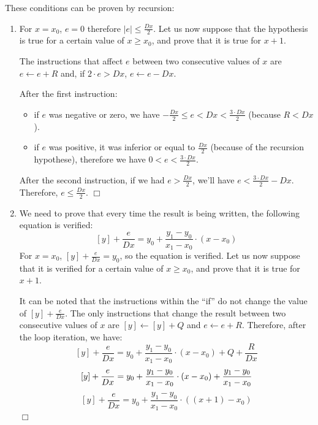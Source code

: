 \documentclass[a4paper,11pt]{kthesis}
\begin{document}
These conditions can be proven by recursion:
\begin{enumerate}
\item For $x = x_{0}$, $e = 0$ therefore $|e| \leq \frac{Dx}{2}$. Let us now suppose that the hypothesis is true for a certain value of $x \geq x_{0}$, and prove that it is true for $x+1$.

The instructions that affect $e$ between two consecutive values of $x$ are $e \leftarrow e + R$ and, if $2\cdot e > Dx$, $e \leftarrow e - Dx$.

After the first instruction:
\begin{itemize}
\item if $e$ was negative or zero, we have $-\frac{Dx}{2} \leq e < Dx < \frac{3 \cdot Dx}{2} $ (because $R < Dx$).
\item if $e$ was positive, it was inferior or equal to $\frac{Dx}{2}$ (because of the recursion hypothese), therefore we have $0 < e < \frac{3 \cdot Dx}{2} $.
\end{itemize}
After the second instruction, if we had $e > \frac{Dx}{2}$, we'll have $e < \frac{3 \cdot Dx}{2} - Dx$. Therefore, $e \leq \frac{Dx}{2}$. $\Box$

\item We need to prove that every time the result is being written, the following equation is verified:
\begin{equation}
\hspace{0cm} [y] + \frac{e}{Dx} = y_{0} + \frac{y_{1}-y_{0}}{x_{1}-x_{0}} \cdot (x - x_{0})
\end{equation}
For $x = x_{0}$, $[y] + \frac{e}{Dx} = y_{0}$, so the equation is verified. Let us now suppose that it is verified for a certain value of $x \geq x_{0}$, and prove that it is true for $x+1$.

It can be noted that the instructions within the ``if'' do not change the value of $[y] + \frac{e}{Dx}$. The only instructions that change the result between two consecutive values of $x$ are $[y] \leftarrow [y] + Q$ and $e \leftarrow e + R$. Therefore, after the loop iteration, we have:
\begin{equation}
\hspace{0cm} [y] + \frac{e}{Dx} = y_{0} + \frac{y_{1}-y_{0}}{x_{1}-x_{0}} \cdot (x - x_{0}) + Q + \frac{R}{Dx}
\end{equation}
\begin{equation}
\hspace{0cm} [y] + \frac{e}{Dx} = y_{0} + \frac{y_{1}-y_{0}}{x_{1}-x_{0}} \cdot (x - x_{0}) + \frac{y_{1}-y_{0}}{x_{1}-x_{0}} \\
\end{equation}
\begin{equation}
\hspace{0cm} [y] + \frac{e}{Dx} = y_{0} + \frac{y_{1}-y_{0}}{x_{1}-x_{0}} \cdot ((x + 1) - x_{0})
\end{equation}
$\Box$
\end{enumerate}
\end{document}
